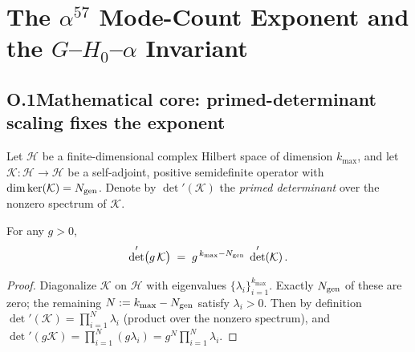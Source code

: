 
%

\section{The $\alpha^{57}$ Mode-Count Exponent and the $G$--$H_0$--$\alpha$ Invariant}
\label{app:O_alpha57_clean}

\subsection{O.1\quad Mathematical core: primed-determinant scaling fixes the exponent}
Let $\mathcal{H}$ be a finite-dimensional complex Hilbert space of dimension $k_{\max}$, and let
$\mathcal{K}:\mathcal{H}\to\mathcal{H}$ be a self-adjoint, positive semidefinite operator with
$\dim\ker(\mathcal{K})=N_{\rm gen}$.
Denote by $\det'(\mathcal{K})$ the \emph{primed determinant} over the nonzero spectrum of $\mathcal{K}$.

\begin{lemma}
\label{lem:O_det_scaling}
For any $g>0$,
\begin{equation}
\det'\!\big(g\,\mathcal{K}\big)\;=\; g^{\,k_{\max}-N_{\rm gen}}\;\det'(\mathcal{K})\,.
\end{equation}
\end{lemma}

\begin{proof}
Diagonalize $\mathcal{K}$ on $\mathcal{H}$ with eigenvalues $\{\lambda_i\}_{i=1}^{k_{\max}}$.
Exactly $N_{\rm gen}$ of these are zero; the remaining $N:=k_{\max}-N_{\rm gen}$ satisfy $\lambda_i>0$.
Then by definition $\det'(\mathcal{K})=\prod_{i=1}^{N}\lambda_i$ (product over the nonzero spectrum), and
$\det'(g\mathcal{K})=\prod_{i=1}^{N}(g\lambda_i)=g^{N}\prod_{i=1}^{N}\lambda_i$.
\end{proof}

